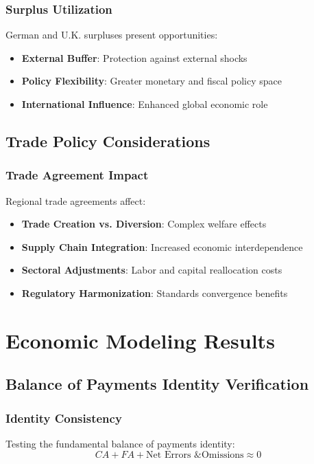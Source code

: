 \documentclass[11pt,a4paper]{article}
\begin{document}
\subsubsection{Surplus Utilization}
German and U.K. surpluses present opportunities:

\begin{itemize}
    \textbf{Investment Capacity}: Resources for domestic and foreign investment
    \item \textbf{External Buffer}: Protection against external shocks
    \item \textbf{Policy Flexibility}: Greater monetary and fiscal policy space
    \item \textbf{International Influence}: Enhanced global economic role
\end{itemize}

\subsection{Trade Policy Considerations}

\subsubsection{Trade Agreement Impact}
Regional trade agreements affect:

\begin{itemize}
    \item \textbf{Trade Creation vs. Diversion}: Complex welfare effects
    \item \textbf{Supply Chain Integration}: Increased economic interdependence
    \item \textbf{Sectoral Adjustments}: Labor and capital reallocation costs
    \item \textbf{Regulatory Harmonization}: Standards convergence benefits
\end{itemize}

\section{Economic Modeling Results}

\subsection{Balance of Payments Identity Verification}
\subsubsection{Identity Consistency}
Testing the fundamental balance of payments identity:
\begin{equation}
CA + FA + \text{Net Errors \& Omissions} \approx 0
\end{equation}
\end{document}
